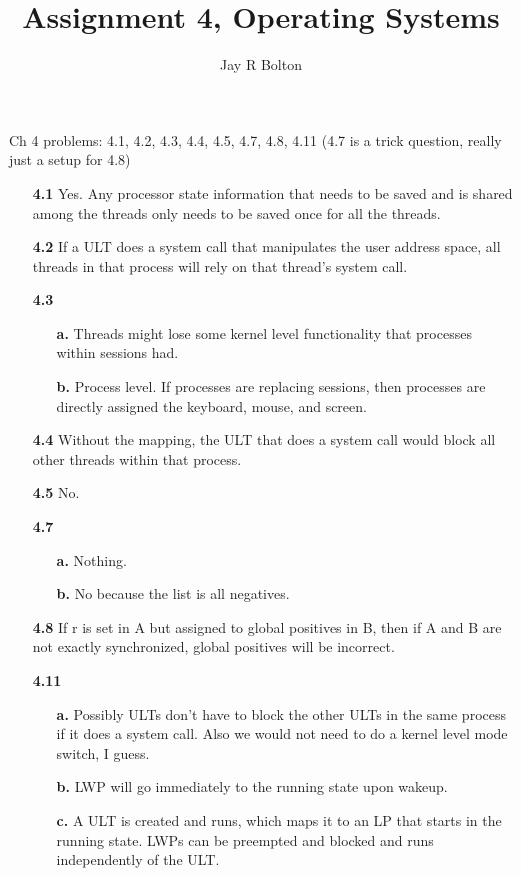 \documentclass{article}
\title{Assignment 4, Operating Systems}
\author{Jay R Bolton}
\begin{document}
\maketitle

Ch 4 problems: 4.1, 4.2, 4.3, 4.4, 4.5, 4.7, 4.8, 4.11 (4.7 is a trick question, really just a setup for 4.8)

\begin{enumerate}

\item[\textbf{4.1}]
Yes. Any processor state information that needs to be saved and is shared among
the threads only needs to be saved once for all the threads.

\item[\textbf{4.2}]
If a ULT does a system call that manipulates the user address space, all
threads in that process will rely on that thread's system call.

\item[\textbf{4.3}]
\begin{enumerate}
\item[\textbf{a.}]
 Threads might lose some kernel level functionality that processes within
 sessions had.
\item[\textbf{b.}]
 Process level. If processes are replacing sessions, then processes are
 directly assigned the keyboard, mouse, and screen.
 \end{enumerate}

\item[\textbf{4.4}]
 Without the mapping, the ULT that does a system call would block all other
 threads within that process.

\item[\textbf{4.5}]
 No. 

\item[\textbf{4.7}]
\begin{enumerate}
\item[\textbf{a.}]
Nothing.
\item[\textbf{b.}]
No because the list is all negatives.
\end{enumerate}

\item[\textbf{4.8}]
If r is set in A but assigned to global positives in B, then if A and B are not
exactly synchronized, global positives will be incorrect.

\item[\textbf{4.11}]
\begin{enumerate}
\item[\textbf{a.}]
Possibly ULTs don't have to block the other ULTs in the same process if it does
a system call. Also we would not need to do a kernel level mode switch, I
guess. 
\item[\textbf{b.}]
LWP will go immediately to the running state upon wakeup. 
\item[\textbf{c.}]
A ULT is created and runs, which maps it to an LP that starts in the running
state. LWPs can be preempted and blocked and runs independently of the ULT.

\end{enumerate}


\end{enumerate}
\end{document}
